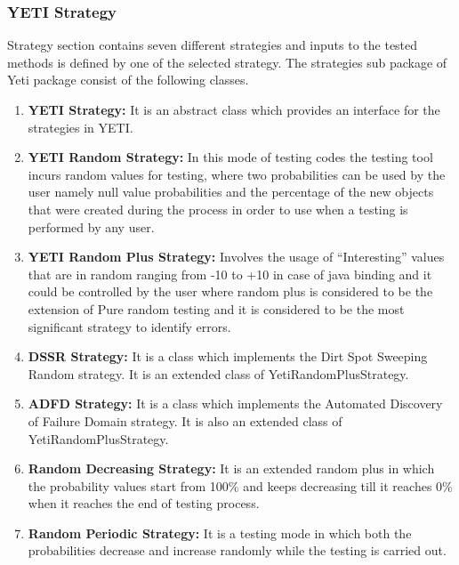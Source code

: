 \subsubsection{YETI Strategy}
Strategy section contains seven different strategies and inputs to the tested methods is defined by one of the selected strategy. The strategies sub package of Yeti package consist of the following classes.
\begin{enumerate}
\item {\textbf{YETI Strategy:}} It is an abstract class which provides an interface for the strategies in YETI.
\item {\textbf{YETI Random Strategy:}} In this mode of testing codes the testing tool incurs random values for testing, where two probabilities can be used by the user namely null value probabilities and the percentage of the new objects that were created during the process in order to use when a testing is performed by any user.
\item {\textbf{YETI Random Plus Strategy:}} Involves the usage of “Interesting” values that are in random ranging from -10 to +10 in case of java binding and it could be controlled by the user where random plus is considered to be the extension of Pure random testing and it is considered to be the most significant strategy to identify errors.
\item {\textbf{DSSR Strategy:}} It is a class which implements the Dirt Spot Sweeping Random strategy. It is an extended class of YetiRandomPlusStrategy.
\item {\textbf{ADFD Strategy:}} It is a class which implements the Automated Discovery of Failure Domain strategy. It is also an extended class of YetiRandomPlusStrategy.
\item {\textbf{Random Decreasing Strategy:}} It is an extended random plus in which the probability values start from 100\% and keeps decreasing till it reaches 0\% when it reaches the end of testing process.
\item {\textbf{Random Periodic Strategy:}} It is a testing mode in which both the probabilities decrease and increase randomly while the testing is carried out.
\end{enumerate}

